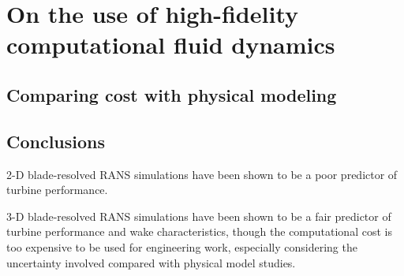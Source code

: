 \chapter{On the use of high-fidelity computational fluid dynamics}


\section{Comparing cost with physical modeling}


\section{Conclusions}

2-D blade-resolved RANS simulations have been shown to be a poor predictor of
turbine performance.

3-D blade-resolved RANS simulations have been shown to be a fair predictor of
turbine performance and wake characteristics, though the computational cost is
too expensive to be used for engineering work, especially considering the
uncertainty involved compared with physical model studies.